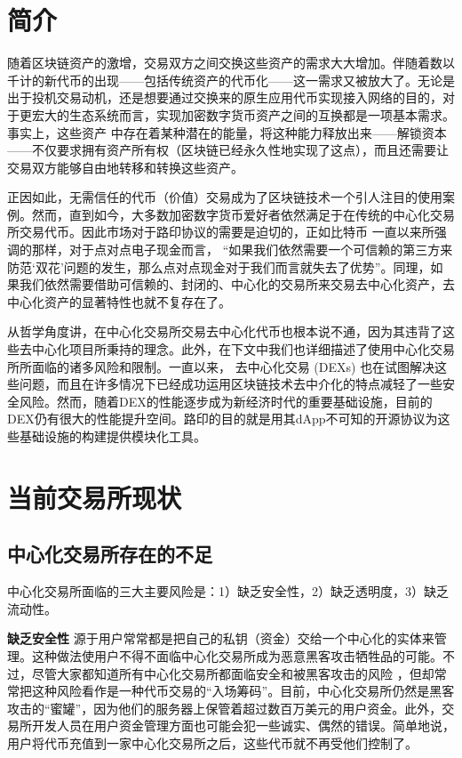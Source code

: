 \documentclass[UTF8]{ctexart}
\begin{document}
\begin{multicols}{2}
\section{简介\label{sec:introduction}}

随着区块链资产的激增，交易双方之间交换这些资产的需求大大增加。伴随着数以千计的新代币的出现——包括传统资产的代币化——这一需求又被放大了。无论是出于投机交易动机，还是想要通过交换来的原生应用代币实现接入网络的目的，对于更宏大的生态系统而言，实现加密数字货币资产之间的互换都是一项基本需求。事实上，这些资产 \cite{desotocapital}中存在着某种潜在的能量，将这种能力释放出来——解锁资本——不仅要求拥有资产所有权（区块链已经永久性地实现了这点），而且还需要让交易双方能够自由地转移和转换这些资产。
 
正因如此，无需信任的代币（价值）交易成为了区块链技术一个引人注目的使用案例。然而，直到如今，大多数加密数字货币爱好者依然满足于在传统的中心化交易所交易代币。因此市场对于路印协议的需要是迫切的，正如比特币 \cite{nakamoto2008bitcoin} 一直以来所强调的那样，对于点对点电子现金而言， \enquote{如果我们依然需要一个可信赖的第三方来防范‘双花’问题的发生，那么点对点现金对于我们而言就失去了优势}。同理，如果我们依然需要借助可信赖的、封闭的、中心化的交易所来交易去中心化资产，去中心化资产的显著特性也就不复存在了。

从哲学角度讲，在中心化交易所交易去中心化代币也根本说不通，因为其违背了这些去中心化项目所秉持的理念。此外，在下文中我们也详细描述了使用中心化交易所所面临的诸多风险和限制。一直以来， 去中心化交易 (DEXs) \cite{schuh2015bitshares} \cite{bancor} \cite{kyber} 也在试图解决这些问题，而且在许多情况下已经成功运用区块链技术去中介化的特点减轻了一些安全风险。然而，随着DEX的性能逐步成为新经济时代的重要基础设施，目前的DEX仍有很大的性能提升空间。路印的目的就是用其dApp不可知的开源协议为这些基础设施的构建提供模块化工具。

\section{当前交易所现状\label{sec:current_exchange_landscape}}

\subsection{中心化交易所存在的不足}
中心化交易所面临的三大主要风险是：1）缺乏安全性，2）缺乏透明度，3）缺乏流动性。

\textbf{缺乏安全性} 源于用户常常都是把自己的私钥（资金）交给一个中心化的实体来管理。这种做法使用户不得不面临中心化交易所成为恶意黑客攻击牺牲品的可能。不过，尽管大家都知道所有中心化交易所都面临安全和被黑客攻击的风险 \cite{coincheckhack}  \cite{mcmillan2014inside} ，但却常常把这种风险看作是一种代币交易的“入场筹码”。目前，中心化交易所仍然是黑客攻击的“蜜罐”，因为他们的服务器上保管着超过数百万美元的用户资金。此外，交易所开发人员在用户资金管理方面也可能会犯一些诚实、偶然的错误。简单地说，用户将代币充值到一家中心化交易所之后，这些代币就不再受他们控制了。


\end{multicols}
\end{document}
